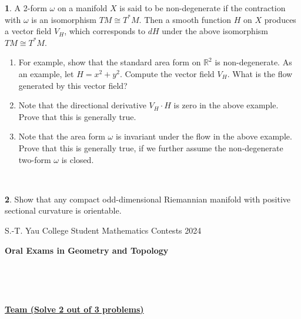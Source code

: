 \documentclass[12pt,a4paper]{amsart}
\theoremstyle{definition}
\newtheorem{problem}{}
\begin{document}
\begin{problem}
A 2-form $\omega$ on a manifold $X$ is said to be non-degenerate if
the contraction with $\omega$ is an isomorphism $TM \cong T^*M$.
Then a smooth function $H$ on $X$ produces a vector field $V_H$,
which corresponds to $dH$ under the above isomorphism $TM \cong
T^*M$.
        \begin{enumerate}
            \item For example, show that the standard area form on $\mathbb{R}^2$ is non-degenerate.  As an example, let $H = x^2+y^2$.  Compute the vector field $V_H$.  What is the flow generated by this vector field?
            \item Note that the directional derivative $V_H \cdot H$ is zero in the above example.  Prove that this is generally true.
            \item Note that the area form $\omega$ is invariant under the flow in the above example.  Prove that this is generally true, if we further assume the non-degenerate two-form $\omega$ is closed.
        \end{enumerate}
\end{problem}

\

\begin{problem}
Show that any compact odd-dimensional Riemannian manifold with
positive sectional curvature is orientable.
\end{problem}





\newpage

\begin{center}
S.-T. Yau College Student Mathematics Contests 2024\\

\vspace{0.1cm}

\Large {\bf Oral Exams in Geometry and Topology}

\end{center}

\

\

\begin{center}
\Large \underline{\bf Team (Solve 2 out of 3 problems)}

\end{center}

\setcounter{problem}{0} \vspace{1cm}
\end{document}
